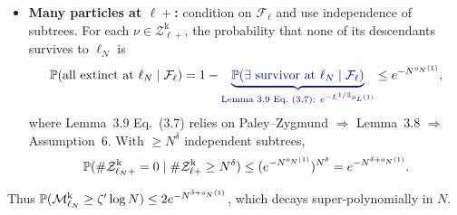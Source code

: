\begin{itemize}
    \item \textbf{Many particles at $\ell+$:} condition on $\mathcal F_\ell$ and use independence of subtrees. For each $\nu\in\mathcal Z^{\mathrm k}_{\ell+}$, the probability that none of its descendants survives to $\ell_N$ is
    \[
        \P(\text{all extinct at }\ell_N\mid\mathcal F_\ell)
        =1-{\color{blue!60!black}\underbrace{\P(\exists\text{ survivor at }\ell_N\mid\mathcal F_\ell)}_{\text{Lemma~3.9 Eq.~(3.7): }e^{-L^{1/3}o_L(1)}}}
        \le e^{-N^{o_N(1)}},
    \]
    where Lemma~3.9 Eq.~(3.7) relies on Paley--Zygmund $\Rightarrow$ Lemma~3.8 $\Rightarrow$ {\color{blue!60!black}Assumption~6}. With $\ge N^\delta$ independent subtrees,
    \[
        \P(\#\mathcal Z^{\mathrm k}_{\ell_N+}=0\mid\#\mathcal Z^{\mathrm k}_{\ell+}\ge N^\delta)
        \le(e^{-N^{o_N(1)}})^{N^\delta}=e^{-N^{\delta+o_N(1)}}.
    \]
\end{itemize}
\vspace{-1mm}
Thus $\P(\mathcal M^{\mathrm k}_{\ell_N}\ge\zeta'\log N)\le 2e^{-N^{\delta+o_N(1)}}$, which decays super-polynomially in $N$.
